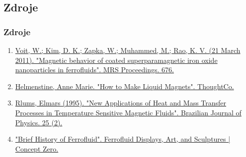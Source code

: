 \documentclass[dvipsnames]{beamer}
\begin{document}
\begin{frame}
	\section{Zdroje}
	\frametitle{Zdroje}
	{\tiny
		\begin{enumerate}
			\item \href{https://www.doi.org/10.1557/PROC-676-Y7.8}{Voit, W.; Kim, D. K.; Zapka, W.; Muhammed, M.; Rao, K. V. (21 March 2011). "Magnetic behavior of coated superparamagnetic iron oxide nanoparticles in ferrofluids". MRS Proceedings. 676.}
			\item \href{https://www.thoughtco.com/how-to-make-liquid-magnets-606319}{Helmenstine, Anne Marie. "How to Make Liquid Magnets". ThoughtCo.}
			\item \href{http://www.sbfisica.org.br/bjp/download/v25/v25a10.pdf}{Rlums, Elmars (1995). "New Applications of Heat and Mass Transfer Processes in Temperature Sensitive Magnetic Fluids". Brazilian Journal of Physics. 25 (2).}
			\item \href{https://www.czferro.com/ferrofluid-history}{"Brief History of Ferrofluid". Ferrofluid Displays, Art, and Sculptures | Concept Zero.}
		\end{enumerate}}
\end{frame}
\end{document}
